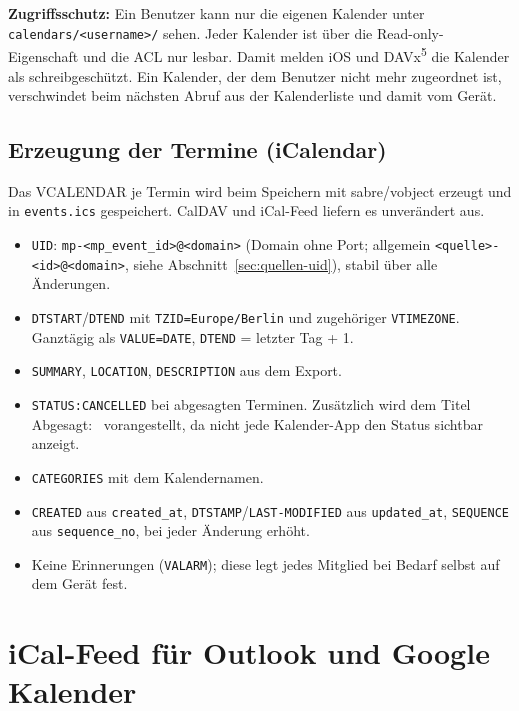 \documentclass[a4paper,fontsize=10pt]{scrartcl}
\newcommand{\code}[1]{\texttt{#1}}
\begin{document}
\textbf{Zugriffsschutz:} Ein Benutzer kann nur die eigenen Kalender unter
\code{calendars/<username>/} sehen. Jeder Kalender ist über die
Read-only-Eigenschaft und die ACL nur lesbar. Damit melden iOS und
DAVx\textsuperscript{5} die Kalender als schreibgeschützt. Ein
Kalender, der dem Benutzer nicht mehr zugeordnet ist, verschwindet beim
nächsten Abruf aus der Kalenderliste und damit vom Gerät.

\subsection{Erzeugung der Termine (iCalendar)}

Das VCALENDAR je Termin wird beim Speichern mit sabre/vobject erzeugt und in
\code{events.ics} gespeichert. CalDAV und iCal-Feed liefern es unverändert
aus.

\begin{itemize}
  \item \code{UID}: \code{mp-<mp\_event\_id>@<domain>} (Domain ohne Port;
        allgemein \code{<quelle>-<id>@<domain>}, siehe Abschnitt~\ref{sec:quellen-uid}),
        stabil über alle Änderungen.
  \item \code{DTSTART}/\code{DTEND} mit \code{TZID=Europe/Berlin} und
        zugehöriger \code{VTIMEZONE}. Ganztägig als \code{VALUE=DATE},
        \code{DTEND} = letzter Tag + 1.
  \item \code{SUMMARY}, \code{LOCATION}, \code{DESCRIPTION} aus dem Export.
  \item \code{STATUS:CANCELLED} bei abgesagten Terminen. Zusätzlich wird
        dem Titel \glqq Abgesagt: \grqq\ vorangestellt, da nicht jede
        Kalender-App den Status sichtbar anzeigt.
  \item \code{CATEGORIES} mit dem Kalendernamen.
  \item \code{CREATED} aus \code{created\_at},
        \code{DTSTAMP}/\code{LAST-MODIFIED} aus \code{updated\_at},
        \code{SEQUENCE} aus \code{sequence\_no}, bei jeder Änderung erhöht.
  \item Keine Erinnerungen (\code{VALARM}); diese legt jedes Mitglied bei
        Bedarf selbst auf dem Gerät fest.
\end{itemize}

\section{iCal-Feed für Outlook und Google Kalender}
\end{document}
